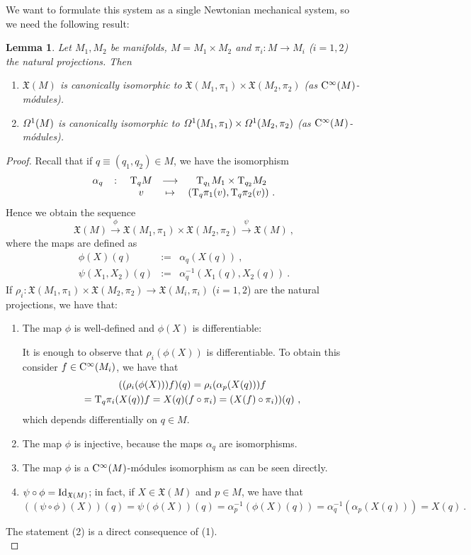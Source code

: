 \documentclass[12pt]{report}
\newtheorem{lem}[teor]{Lemma}
\def\beann{\begin{eqnarray*}}
\def\eeann{\end{eqnarray*}}
\def\ben{\begin{enumerate}}
\def\een{\end{enumerate}}
\def\mapping#1{\mathrel{\mathop{\longrightarrow}\limits^{#1}}}
\def\qed{\ifvmode\removelastskip\fi
{\unskip\nobreak\hfil\penalty50\hbox{}\nobreak\hfil
\hbox{\vrule height1.2ex width1.2ex}\parfillskip=0pt
\finalhyphendemerits=0 \par\smallskip}}
\def\vf{\mathfrak X}
\def\df{{\mit\Omega}}
\def\Tan{{\rm T}}
\def\Cinfty{{\rm C}^\infty}
\begin{document}
We want to formulate this system as a single Newtonian mechanical system, so we need the following result:

\begin{lem}
Let $M_1,M_2$ be manifolds, $M=M_1\times M_2$ and  $\pi_i\colon M\to  M_i$ ($i=1,2$) the natural projections. Then
\ben
\item
$\vf (M)$ is canonically isomorphic to
$\vf (M_1,\pi_1)\times\vf (M_2,\pi_2)$ (as $\Cinfty(M)$-m\'odules).
\item
$\df^1(M)$ is canonically isomorphic to
$\df^1(M_1,\pi_1)\times\df^1(M_2,\pi_2)$ (as $\Cinfty(M)$-m\'odules).
\een
\end{lem}
\begin{proof}
Recall that if $q\equiv (q_1,q_2)\in M$, we have the isomorphism
$$
\begin{array}{ccccc}
\alpha_q & \colon & \Tan_qM & \longrightarrow & \Tan_{q_1}M_1\times\Tan_{q_2}M_2  \\
& & v &\mapsto & (\Tan_q\pi_1(v),\Tan_q\pi_2(v)) \ .
\end{array}
$$
Hence we obtain the sequence
$$
\vf (M) \mapping{\phi} \vf (M_1,\pi_1)\times\vf (M_2,\pi_2) \mapping{\psi}\vf (M) \ ,
$$
where the maps are defined as
\beann
\phi (X)(q)&:=&\alpha_q (X(q)) \ , \\
\psi (X_1,X_2)(q)&:=&\alpha_q^{-1}(X_1(q),X_2(q)) \ .
\eeann
If $\rho_i\colon\vf (M_1,\pi_1)\times\vf (M_2,\pi_2)\to\vf (M_i,\pi_i)$ ($i=1,2$)
are the natural projections, we have that:
\ben
\item
The map $\phi$ is well-defined and $\phi (X)$ is differentiable:

It is enough to observe that $\rho_i(\phi(X))$ is differentiable.
To obtain this consider $f\in\Cinfty (M_i)$, we have that
\begin{multline*}
((\rho_i(\phi(X)))f)(q)=\rho_i(\alpha_p(X(q)))f
\\=\Tan_q\pi_i(X(q))f=
X(q)(f\circ\pi_i)=(X(f)\circ\pi_i))(q) \ ,
\end{multline*}
which depends differentially on $q\in M$.
\item
The map $\phi$ is injective, because the maps $\alpha_q$ are isomorphisms.
\item
The map $\phi$ is a $\Cinfty(M)$-m\'odules isomorphism as can be seen directly.
\item
$\psi\circ\phi={\rm Id}_{\vf (M)}$;
in fact, if $X\in\vf(M)$ and $p\in M$, we have that
$$
((\psi\circ\phi)(X))(q)=\psi(\phi (X))(q)=\alpha_p^{-1}(\phi(X)(q))=
\alpha_q^{-1}(\alpha_p(X(q)))=X(q) \ .
$$
\een

The statement (2) is a direct consequence of (1).
\\ \qed \end{proof}
\end{document}
